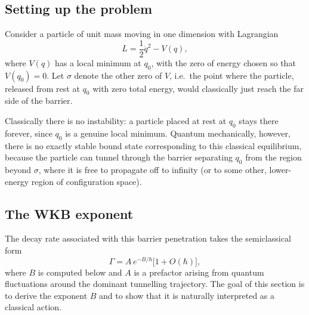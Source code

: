 \subsection{Setting up the problem}

Consider a particle of unit mass moving in one dimension with Lagrangian
\begin{equation}
L = \frac{1}{2}\dot q^2 - V(q),
\label{eq:1d-lagrangian}
\end{equation}
where $V(q)$ has a local minimum at $q_0$, with the zero of energy chosen so that $V(q_0) = 0$. Let $\sigma$ denote the other zero of $V$, i.e.\ the point where the particle, released from rest at $q_0$ with zero total energy, would classically just reach the far side of the barrier.


Classically there is no instability: a particle placed at rest at $q_0$ stays there forever, since $q_0$ is a genuine local minimum. Quantum mechanically, however, there is no exactly stable bound state corresponding to this classical equilibrium, because the particle can tunnel through the barrier separating $q_0$ from the region beyond $\sigma$, where it is free to propagate off to infinity (or to some other, lower-energy region of configuration space).

\subsection{The WKB exponent}

The decay rate associated with this barrier penetration takes the semiclassical form
\begin{equation}
\Gamma = A\, e^{-B/\hbar}\big[1+O(\hbar)\big],
\label{eq:gamma-semiclassical}
\end{equation}
where $B$ is computed below and $A$ is a prefactor arising from quantum fluctuations around the dominant tunnelling trajectory. The goal of this section is to derive the exponent $B$ and to show that it is naturally interpreted as a classical action.

